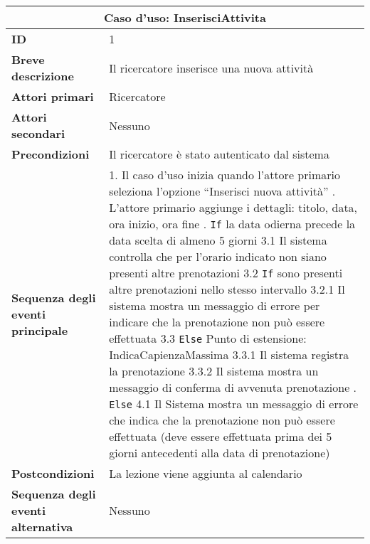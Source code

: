 \documentclass[11pt,a4paper]{report}
\begin{document}
\begin{table}[h!]
\centering
\renewcommand{\arraystretch}{1.3}
\begin{tabular}{|p{4.2cm}|p{10.2cm}|}
\hline
\multicolumn{2}{|c|}{\textbf{Caso d’uso: InserisciAttivita}} \\ \hline
\textbf{ID} & 1 \\ \hline
\textbf{Breve descrizione} & Il ricercatore inserisce una nuova attività \\ \hline
\textbf{Attori primari} & Ricercatore \\ \hline
\textbf{Attori secondari} & Nessuno \\ \hline
\textbf{Precondizioni} & Il ricercatore è stato autenticato dal sistema \\ \hline
\textbf{Sequenza degli eventi principale} &
1. Il caso d’uso inizia quando l'attore primario seleziona l’opzione “Inserisci nuova attività” \newline
2. L'attore primario aggiunge i dettagli: titolo, data, ora inizio, ora fine \newline
3. \texttt{If} la data odierna precede la data scelta di almeno 5 giorni \newline
\hspace*{1cm} 3.1 Il sistema controlla che per l’orario indicato non siano presenti altre prenotazioni \newline
\hspace*{1cm} 3.2 \texttt{If} sono presenti altre prenotazioni nello stesso intervallo \newline
\hspace*{1.5cm} 3.2.1 Il sistema mostra un messaggio di errore per indicare che la prenotazione non può essere effettuata \newline
\hspace*{1cm} 3.3 \texttt{Else} \newline
\hspace*{1cm} Punto di estensione: IndicaCapienzaMassima \newline
\hspace*{1.5cm} 3.3.1 Il sistema registra la prenotazione \newline
\hspace*{1.5cm} 3.3.2 Il sistema mostra un messaggio di conferma di avvenuta prenotazione \newline
4. \texttt{Else} \newline
\hspace*{0.5cm} 4.1 Il Sistema mostra un messaggio di errore che indica che la prenotazione non può essere effettuata (deve essere effettuata prima dei 5 giorni antecedenti alla data di prenotazione) \\ \hline
\textbf{Postcondizioni} & La lezione viene aggiunta al calendario \\ \hline
\textbf{Sequenza degli eventi alternativa} & Nessuno \\ \hline
\end{tabular}
\end{table}
\end{document}
